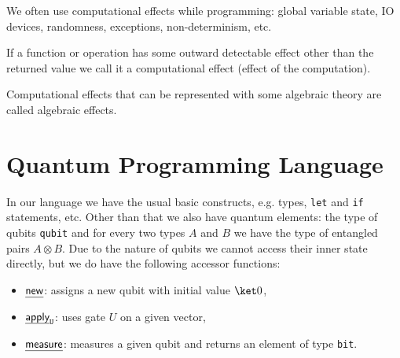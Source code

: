 \documentclass[a4paper]{article}
\begin{document}
We often use computational effects while programming:
global variable state, IO devices, randomness, exceptions, non-determinism, etc.


\begin{definition}
    If a function or operation has some outward detectable effect other than the returned value we call it a computational effect (effect of the computation).
\end{definition}

\begin{definition}
    Computational effects that can be represented with some algebraic theory are called algebraic effects.
\end{definition}


\section{Quantum Programming Language}

In our language\cite{algeff-lin-qpl} we have the usual basic constructs, e.g. types, \texttt{let} and \texttt{if} statements, etc.
Other than that we also have quantum elements:
the type of qubits \texttt{qubit} and for every two types \(A\) and \(B\) we have the type of entangled pairs \( A⊗B \).
Due to the nature of qubits we cannot access their inner state directly, but we do have the following accessor functions:
\begin{itemize}
    \item \(\eff{new}\): assigns a new qubit with initial value \(\ket 0\),
    \item \(\eff{apply}_{\g U}\): uses gate \(U\) on a given vector,
    \item \(\eff{measure}\): measures a given qubit and returns an element of type \texttt{bit}.
\end{itemize}
\end{document}
